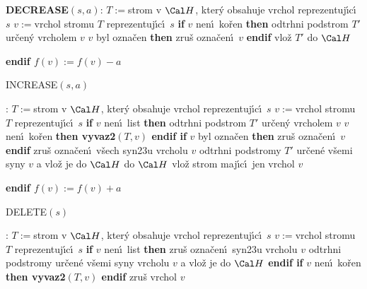 {\bf DECREASE$(s,a)$}:\newline 
$T:=$strom v $\Cal H$, kter\'y obsahuje vrchol reprezentuj\'\i c\'\i\ $
s$\newline 
$v:=$vrchol stromu $T$ reprezentuj\'\i c\'\i\ $s$\newline 
{\bf if} $v$ nen\'\i\ ko\v ren {\bf then \newline 
\phantom{{\rm ---}}}odtrhni podstrom $T'$ ur\v cen\'y vrcholem $v$\newline 
{} $v$ byl ozna\v cen {\bf then} zru\v s ozna\v cen\'\i\ $
v$ {\bf endif\newline 
\phantom{{\rm ---}}}vlo\v z $T'$ do $\Cal H$\newline 
{\bf endif\newline 
$f(v):=f(v)-a$
\bigskip

INCREASE$(s,a)$}:\newline 
$T:=$strom v $\Cal H$, kter\'y obsahuje vrchol reprezentuj\'\i c\'\i\ $
s$\newline 
$v:=$vrchol stromu $T$ reprezentuj\'\i c\'\i\ $s$\newline 
{\bf if} $v$ nen\'\i\ list {\bf then \newline 
\phantom{{\rm ---}}}odtrhni podstrom $T'$ ur\v cen\'y vrcholem $v$\newline 
\phantom{---}{\bf if} $v$ nen\'\i\ ko\v ren {\bf then vyvaz2$(T,v
)$ endif\newline 
\phantom{{\rm ---}}if} $v$ byl ozna\v cen {\bf then} zru\v s ozna\v cen\'\i\ $
v$ {\bf endif\newline 
\phantom{{\rm ---}}}zru\v s ozna\v cen\'\i\ v\v sech syn\accent23u vrcholu $
v$\newline 
\phantom{---}odtrhni podstromy $T'$ ur\v cen\'e v\v semi syny $v$ 
a vlo\v z je do $\Cal H$\newline 
\phantom{{\bf ---}}do $\Cal H$ vlo\v z strom maj\'\i c\'\i\ jen vrchol $
v$\newline 
{\bf endif\newline 
$f(v):=f(v)+a$
\bigskip

DELETE$(s)$}:\newline 
$T:=$strom v $\Cal H$, kter\'y obsahuje vrchol reprezentuj\'\i c\'\i\ $
s$\newline 
$v:=$vrchol stromu $T$ reprezentuj\'\i c\'\i\ $s$\newline 
{\bf if} $v$ nen\'\i\ list {\bf then\newline 
\phantom{{\rm ---}}}zru\v s ozna\v cen\'\i\ syn\accent23u vrcholu $
v$\newline 
\phantom{---}odtrhni podstromy ur\v cen\'e v\v semi syny 
vrcholu $v$ a vlo\v z je do $\Cal H$\newline 
{\bf endif\newline 
if} $v$ nen\'\i\ ko\v ren {\bf then vyvaz2$(T,v)$ endif\newline 
}
zru\v s vrchol $v$
\bigskip

